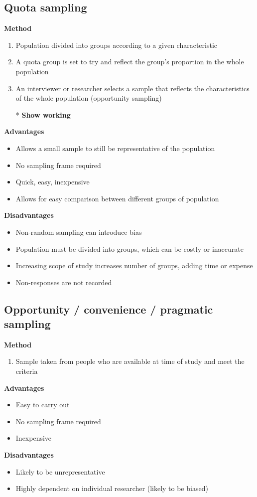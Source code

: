 \documentclass[oneside,fleqn,11pt]{book}
\begin{document}
	\subsection{Quota sampling}
	\textbf{Method}
	\begin{enumerate}
		\item Population divided into groups according to a given characteristic
		\item A quota group is set to try and reflect the group's proportion in the whole population
		\item An interviewer or researcher selects a sample that reflects the characteristics of the whole population (opportunity sampling)
		\item[*] \textbf{Show working}
	\end{enumerate}
	\textbf{Advantages}
	\begin{itemize}
		\item Allows a small sample to still be representative of the population
		\item No sampling frame required
		\item Quick, easy, inexpensive
		\item Allows for easy comparison between different groups of population
	\end{itemize}
	\textbf{Disadvantages}
	\begin{itemize}
		\item Non-random sampling can introduce bias
		\item Population must be divided into groups, which can be costly or inaccurate
		\item Increasing scope of study increases number of groups, adding time or expense
		\item Non-responses are not recorded
	\end{itemize}
	
	\subsection{Opportunity / convenience / pragmatic sampling}
	\textbf{Method}
	\begin{enumerate}
		\item Sample taken from people who are available at time of study and meet the criteria
	\end{enumerate}
	\textbf{Advantages}
	\begin{itemize}
		\item Easy to carry out
		\item No sampling frame required
		\item Inexpensive
	\end{itemize}
	\textbf{Disadvantages}
	\begin{itemize}
		\item Likely to be unrepresentative
		\item Highly dependent on individual researcher (likely to be biased)
	\end{itemize}
	
\end{document}
